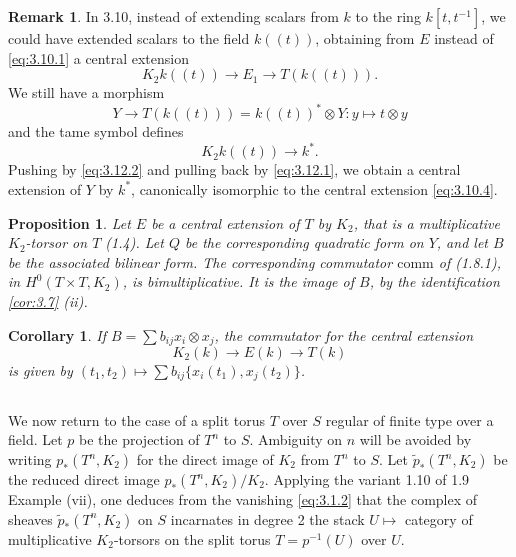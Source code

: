 \documentclass[11pt,a4paper]{article}
\theoremstyle{plain}
\newtheorem{proposition}[theorem]{Proposition}
\newtheorem{corollary}[theorem]{Corollary}
\theoremstyle{definition}
\newtheorem{remark}[theorem]{Remark}
\begin{document}
\begin{remark}\label{rem:3.12}
In 3.10, instead of extending scalars from $k$ to the ring $k[t, t^{-1}]$, we could have extended scalars to the field $k((t))$, obtaining from $E$ instead of \eqref{eq:3.10.1} a central extension
\[K_2k((t)) \to E_1 \to T(k((t))).\]
We still have a morphism
\begin{equation}\label{eq:3.12.1}
Y \to T(k((t))) = k((t))^* \otimes Y: y \mapsto t \otimes y
\end{equation}
and the tame symbol defines
\begin{equation}\label{eq:3.12.2}
K_2 k((t)) \to k^*.
\end{equation}
Pushing by \eqref{eq:3.12.2} and pulling back by \eqref{eq:3.12.1}, we obtain a central extension of $Y$ by $k^*$, canonically isomorphic to the central extension \eqref{eq:3.10.4}.
\end{remark}

\begin{proposition}\label{prop:3.13}
Let $E$ be a central extension of $T$ by $K_2$, that is a multiplicative $K_2$-torsor on $T$ \textup{(1.4)}. Let $Q$ be the corresponding quadratic form on $Y$, and let $B$ be the associated bilinear form. The corresponding commutator $\mathrm{comm}$ of \textup{(1.8.1)}, in $H^0(T \times T, K_2)$, is bimultiplicative. It is the image of $B$, by the identification \ref{cor:3.7} \textup{(ii)}.
\end{proposition}

\begin{corollary}\label{cor:3.14}
If $B = \sum b_{ij} x_i \otimes x_j$, the commutator for the central extension
\[K_2(k) \to E(k) \to T(k)\]
is given by $(t_1, t_2) \mapsto \sum b_{ij} \{x_i(t_1), x_j(t_2)\}$.
\end{corollary}

\subsection{}
We now return to the case of a split torus $T$ over $S$ regular of finite type over a field. Let $p$ be the projection of $T^n$ to $S$. Ambiguity on $n$ will be avoided by writing $p_*(T^n, K_2)$ for the direct image of $K_2$ from $T^n$ to $S$. Let $\tilde{p}_*(T^n, K_2)$ be the reduced direct image $p_*(T^n, K_2)/K_2$. Applying the variant 1.10 of 1.9 Example (vii), one deduces from the vanishing \eqref{eq:3.1.2} that the complex of sheaves $\tilde{p}_*(T^n, K_2)$ on $S$ incarnates in degree 2 the stack $U \mapsto$ category of multiplicative $K_2$-torsors on the split torus $T = p^{-1}(U)$ over $U$.
\end{document}
